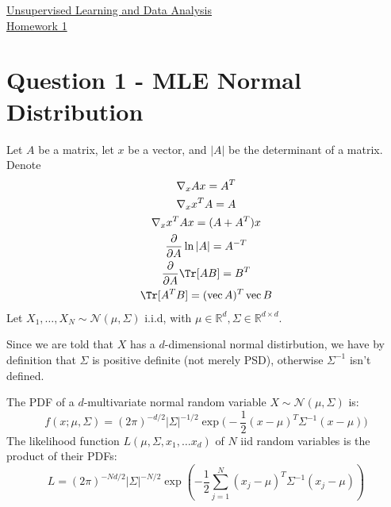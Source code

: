 \documentclass{article}
\begin{document}
\begin{center}
  {\huge \underline{Unsupervised Learning and Data Analysis} \\[5pt] \ul{Homework 1}}
\end{center}
\section*{Question 1 - MLE Normal Distribution}
Let $A$ be a matrix, let $x$ be a vector, and $|A|$ be the determinant of a matrix.
Denote
\begin{gather}
  \nabla_{x} Ax = A^{T} \label{eq:gradX} \\
  \nabla_{x} x^{T}A = A \label{eq:gradXT} \\
  \nabla_{x} x^{T}Ax = (A+A^{T}) x \label{eq:gradxtAx} \\
  \frac{\partial }{\partial A} \ln |A| = A^{-T} \label{eq:gradLnDet} \\
  \frac{\partial }{\partial A} \Tr [AB] = B^{T} \label{eq:gradTrProd} \\
  \Tr [A^{T} B] = (\operatorname{vec}A)^{T} \operatorname{vec}B
\end{gather}
Let $X_1, \ldots, X_{N} \sim \mathcal{N}(\mu, \Sigma)$ i.i.d, with $\mu \in \mathbb{R}^{d}, \Sigma \in \mathbb{R}^{d \times d}$.  

Since we are told that $X$ has a $d$-dimensional normal distirbution, we have by definition that  $\Sigma$ is positive definite (not merely PSD), otherwise $\Sigma ^{-1}$ isn't defined. 

The PDF of a $d$-multivariate normal random variable $X \sim \mathcal{N}(\mu, \Sigma)$ is:
\[
  f(x ; \mu, \Sigma) = (2 \pi)^{-d/2} | \Sigma |^{-1/2} \exp \big( -\frac{1}{2} (x-\mu)^{T} \Sigma ^{-1}  (x-\mu) \big)
\]
The likelihood function $L(\mu, \Sigma, x_1, \ldots  x_d)$ of $N$ iid random variables is the product of their PDFs:
\[
  L = (2 \pi )^{-Nd/2} | \Sigma|^{-N/2} \exp \left( -\frac{1}{2} \sum_{j=1}^{N} (x_j-\mu)^{T} \Sigma ^{-1}  (x_j-\mu) \right) 
\]
\end{document}

